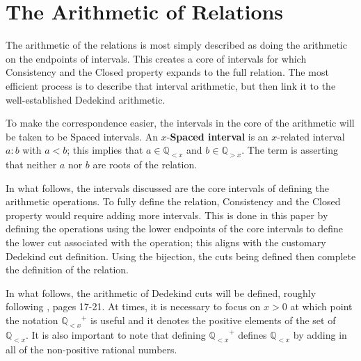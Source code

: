 \documentclass[12pt]{article}
\newcommand{\qcut}[2][x]{\ensuremath{\mathbb{Q}_{#2 #1}}}
\newcommand{\qlt}[1][x]{\qcut[#1]{<}}
\newcommand{\qgt}[1][x]{\qcut[#1]{>}}
\begin{document}
\section{The Arithmetic of Relations}

The arithmetic of the relations is most simply described as doing the arithmetic on the endpoints of intervals. This creates a core of intervals for which Consistency and the Closed property expands to the full relation. The most efficient process is to describe that interval arithmetic, but then link it to the well-established Dedekind arithmetic. 

To make the correspondence easier, the intervals in the core of the arithmetic will be taken to be Spaced intervals. An $x$-\textbf{Spaced interval} is an $x$-related interval $a:b$ with $a < b$; this implies that $a \in \qlt$ and $b \in \qgt$. The term is asserting that neither $a$ nor $b$ are roots of the relation. 

In what follows, the intervals discussed are the core intervals of defining the arithmetic operations. To fully define the relation, Consistency and the Closed property would require adding more intervals. This is done in this paper by defining the operations using the lower endpoints of the core intervals to define the lower cut associated with the operation; this aligns with the customary Dedekind cut definition. Using the bijection, the cuts being defined then complete the definition of the relation.  

In what follows, the arithmetic of Dedekind cuts will be defined, roughly following \cite{rudin}, pages 17-21.  At times, it is necessary to focus on $x > 0$ at which point the notation $\qlt^+$ is useful and it denotes the positive elements of the set of $\qlt$. It is also important to note that defining $\qlt^+$ defines $\qlt$ by adding in all of the non-positive rational numbers.
\end{document}
